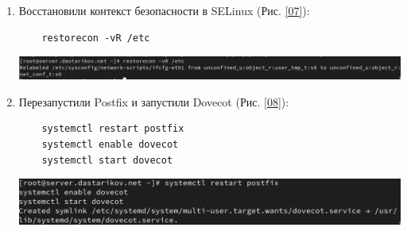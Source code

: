 \begin{enumerate}
\item Восстановили контекст безопасности в SELinux (Рис. \ref{07}):
  \begin{verbatim}
    restorecon -vR /etc
  \end{verbatim}
\begin{center}
    \centering
    \includegraphics[width=\textwidth]{../images/image07.png}
    \label{07}
\end{center}

\item Перезапустили Postfix и запустили Dovecot (Рис. \ref{08}):
  \begin{verbatim}
    systemctl restart postfix
    systemctl enable dovecot
    systemctl start dovecot
  \end{verbatim}
\begin{center}
    \centering
    \includegraphics[width=\textwidth]{../images/image08.png}
    \label{08}
\end{center}
\end{enumerate}


